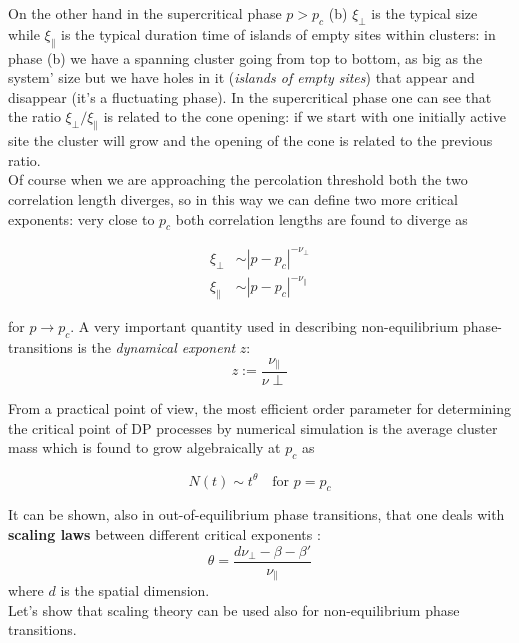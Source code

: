 \documentclass[\main/main.tex]{subfiles}
\begin{document}
On the other hand in the supercritical phase $p>p_c$ (b) $\xi_\perp$ is the typical size while $\xi_\|$ is the typical duration time of islands of empty sites within clusters: in phase (b) we have a spanning cluster going from top to bottom, as big as the system' size but we have holes in it (\textit{islands of empty sites}) that appear and disappear (it's a fluctuating phase).
In the supercritical phase one can see that the ratio $\xi_\perp/\xi_\|$ is related to the cone opening: if we start with one initially active site the cluster will grow and the opening of the cone is related to the previous ratio. \\

Of course when we are approaching the percolation threshold both the two correlation length diverges, so in this way we can define two more critical exponents: very close to $p_{c}$ both correlation lengths are found to diverge as

\begin{align}
\xi_{\perp} & \sim\left|p-p_{c}\right|^{-\nu_{\perp}} \\
\xi_{\|} & \sim\left|p-p_{c}\right|^{-\nu_{\|}}
\end{align}

for $p\to p_c$.
A very important quantity used in describing non-equilibrium phase-transitions is the \textit{dynamical exponent} $z$:
\begin{equation}
    z:=\frac{\nu_\|}{\nu\perp}
\end{equation}

From a practical point of view, the most efficient order parameter for determining the critical point of DP processes by numerical simulation is the average cluster mass which is found to grow algebraically at $p_c$ as

\begin{equation}
    N(t)\sim t^\theta \quad \text{for}\,\, p=p_c
\end{equation}

It can be shown, also in out-of-equilibrium phase transitions, that one deals with \textbf{scaling laws} between different critical exponents :
\begin{equation}
    \theta=\frac{d\nu_\perp - \beta-\beta'}{\nu_\|}
    \label{eq:scaling}
\end{equation}
where $d$ is the spatial dimension. \\
Let's show that scaling theory can be used also for non-equilibrium phase transitions.
\end{document}
